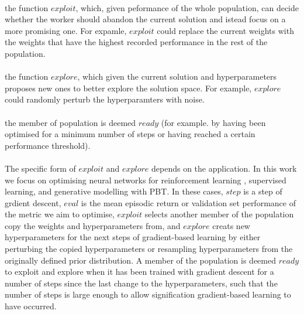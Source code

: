 \documentclass[12pt,a4paper]{article}
\begin{document}
\paragraph{} the function \underline{$\mathit{exploit}$}, which, given peformance of the whole population, can decide whether the worker should abandon the current solution and istead focus on a more promising one. For expamle, $\mathit{exploit}$ could replace the current weights with the weights that have the highest recorded performance in the rest of the population.
\paragraph{} the function \underline{$\mathit{explore}$}, which given the current solution and hyperparameters proposes new ones to better explore the solution space. For example, $\mathit{explore}$ could randomly perturb the hyperparamters with noise.

\paragraph{} the member of population is deemed \underline{$\mathit{ready}$} (for example. by having been optimised for a minimum number of steps or having reached a certain performance threshold). 

\paragraph{} The specific form of $\mathit{exploit}$ and $\mathit{explore}$ depends on the application. In this work we focus on optimising neural networks for reinforcement learning , supervised learning, and generative modelling with PBT. In these cases, $\mathit{step}$ is a step of grdient descent, $\mathit{eval}$ is the mean episodic return or validation set performance of the metric we aim to optimise, $\mathit{exploit}$ selects another member of the population copy the weights and hyperparameters from, and $\mathit{explore}$ creats new hyperparameters for the next steps of gradient-based learning by either perturbing the copied hyperparameters or resampling hyperparameters from the originally defined prior distribution. A member of the population is deemed $\mathit{ready}$ to exploit and explore when it has been trained with gradient descent for a number of steps since the last change to the hyperparameters, such that the number of steps is large enough to allow signification gradient-based learning to have occurred.
\end{document}
